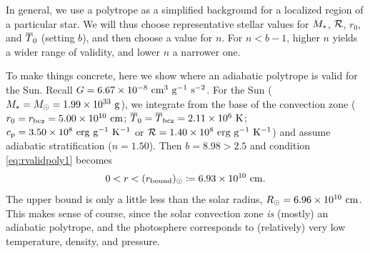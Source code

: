 \documentclass[12pt]{article}
\numberwithin{equation}{section}
\newcommand{\rbound}{r_{\rm{bound}}}
\begin{document}
In general, we use a polytrope as a simplified background for a localized region of a particular star. We will thus choose representative stellar values for $M_*$, $\mathcal{R}$, $r_0$, and $\overline{T}_0$ (setting $b$), and then choose a value for $n$. For $n<b-1$, higher $n$ yields a wider range of validity, and lower $n$ a narrower one. 

To make things concrete, here we show where an adiabatic polytrope is valid for the Sun. Recall $G=\sn{6.67}{-8}\ \cm^3\ \gram^{-1}\ \second^{-2}$. For the Sun ($M_*=M_\odot=1.99\times10^{33}\ {\rm{g}}$), we integrate from the base of the convection zone ($r_0=r_{\rm{bcz}}=5.00\times10^{10}\ {\rm{cm}}$; $\overline{T}_0=\overline{T}_{\rm{bcz}}=2.11\times10^{6}\ {\rm{K}}$; $c_{\rm{p}}=3.50\times10^{8}\ {\rm{erg\ g^{-1}\ K^{-1}}}$ or $\mathcal{R}=1.40\times10^{8}\ {\rm{erg\ g^{-1}\ K^{-1}}}$) and assume adiabatic stratification ($n=1.50$). Then $b=8.98 > 2.5$ and condition \eqref{eq:rvalidpoly1} becomes
\begin{align}\label{eq:rvalidsun}
	0<r<(\rbound)_\odot\define\sn{6.93}{10}\ \cm. 
\end{align}
The upper bound is only a little less than the solar radius, $\rsun=\sn{6.96}{10}\ \cm$. This makes sense of course, since the solar convection zone \textit{is} (mostly) an adiabatic polytrope, and the photosphere corresponds to (relatively) very low temperature, density, and pressure. 
\end{document}
